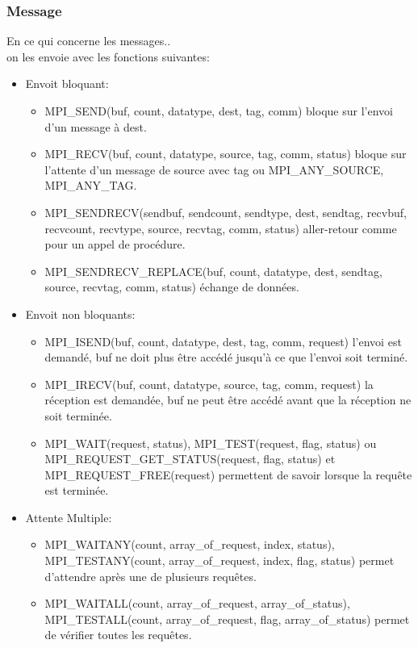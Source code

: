 \documentclass[oneside]{book}
\begin{document}
\subsubsection{Message}
En ce qui concerne les messages..\\

on les envoie avec les fonctions suivantes:\\

\begin{itemize}

\item Envoit bloquant:\\
\begin{itemize}
\item MPI\_SEND(buf, count, datatype, dest, tag, comm) bloque sur
l'envoi d'un message à dest.
\item MPI\_RECV(buf, count, datatype, source, tag, comm, status)
bloque sur l'attente d'un message de source avec tag ou
MPI\_ANY\_SOURCE, MPI\_ANY\_TAG.

\item MPI\_SENDRECV(sendbuf, sendcount, sendtype, dest, sendtag,
recvbuf, recvcount, recvtype, source, recvtag, comm, status)
aller-retour comme pour un appel de procédure.

\item MPI\_SENDRECV\_REPLACE(buf, count, datatype, dest, sendtag,
source, recvtag, comm, status) échange de données.
\end{itemize}

\item Envoit non bloquants:\\
\begin{itemize}
\item MPI\_ISEND(buf, count, datatype, dest, tag, comm, request)
l'envoi est demandé, buf ne doit plus être accédé jusqu'à ce
que l'envoi soit terminé.

\item MPI\_IRECV(buf, count, datatype, source, tag, comm, request)
la réception est demandée, buf ne peut être accédé avant que
la réception ne soit terminée.

\item MPI\_WAIT(request, status), MPI\_TEST(request, flag, status) ou
MPI\_REQUEST\_GET\_STATUS(request, flag, status) et
MPI\_REQUEST\_FREE(request) permettent de savoir lorsque
la requête est terminée.
\end{itemize}

\item Attente Multiple:\\
\begin{itemize}
\item MPI\_WAITANY(count, array\_of\_request, index, status),
MPI\_TESTANY(count, array\_of\_request, index, flag, status)
permet d'attendre après une de plusieurs requêtes.
\item MPI\_WAITALL(count, array\_of\_request, array\_of\_status),
MPI\_TESTALL(count, array\_of\_request, flag, array\_of\_status)
permet de vérifier toutes les requêtes.


\end{itemize}
\end{itemize}
\end{document}
